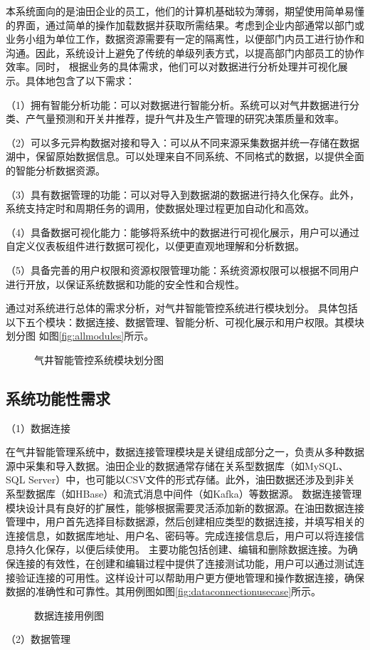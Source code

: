 本系统面向的是油田企业的员工，他们的计算机基础较为薄弱，期望使用简单易懂的界面，通过简单的操作加载数据并获取所需结果。考虑到企业内部通常以部门或业务小组为单位工作，数据资源需要有一定的隔离性，以便部门内员工进行协作和沟通。因此，系统设计上避免了传统的单级列表方式，以提高部门内部员工的协作效率。同时，
根据业务的具体需求，他们可以对数据进行分析处理并可视化展示。具体地包含了以下需求：



（1）拥有智能分析功能：可以对数据进行智能分析。系统可以对气井数据进行分类、产气量预测和开关井推荐，提升气井及生产管理的研究决策质量和效率。

（2）可以多元异构数据对接和导入：可以从不同来源采集数据并统一存储在数据湖中，保留原始数据信息。可以处理来自不同系统、不同格式的数据，以提供全面的智能分析数据资源。

（3）具有数据管理的功能：可以对导入到数据湖的数据进行持久化保存。此外，系统支持定时和周期任务的调用，使数据处理过程更加自动化和高效。

（4）具备数据可视化能力：能够将系统中的数据进行可视化展示，用户可以通过自定义仪表板组件进行数据可视化，以便更直观地理解和分析数据。

（5）具备完善的用户权限和资源权限管理功能：系统资源权限可以根据不同用户进行开放，以保证系统数据和功能的安全性和合规性。

通过对系统进行总体的需求分析，对气井智能管控系统进行模块划分。
具体包括以下五个模块：数据连接、数据管理、智能分析、可视化展示和用户权限。其模块划分图
如图\ref{fig:allmodules}所示。
\begin{figure}[H]
    \centering
    \caption{气井智能管控系统模块划分图}
\end{figure}
\subsection{系统功能性需求}
（1）数据连接

在气井智能管理系统中，数据连接管理模块是关键组成部分之一，负责从多种数据源中采集和导入数据。油田企业的数据通常存储在关系型数据库（如MySQL、SQL Server）中，也可能以CSV文件的形式存储。此外，油田数据还涉及到非关系型数据库（如HBase）和流式消息中间件（如Kafka）等数据源。
数据连接管理模块设计具有良好的扩展性，能够根据需要灵活添加新的数据源。在油田数据连接管理中，用户首先选择目标数据源，然后创建相应类型的数据连接，并填写相关的连接信息，如数据库地址、用户名、密码等。完成连接信息后，用户可以将连接信息持久化保存，以便后续使用。
主要功能包括创建、编辑和删除数据连接。为确保连接的有效性，在创建和编辑过程中提供了连接测试功能，用户可以通过测试连接验证连接的可用性。这样设计可以帮助用户更方便地管理和操作数据连接，确保数据的准确性和可靠性。其用例图如图\ref{fig:dataconnectionusecase}所示。
\begin{figure}[H]
    \centering
    \caption{数据连接用例图}
\end{figure}
（2）数据管理 

